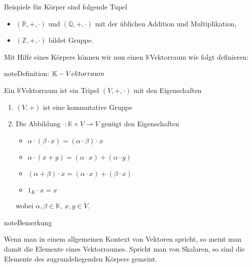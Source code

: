 \documentclass[letterpaper,10pt,english]{jupyterBook}
\begin{document}
Beispiele für Körper sind folgende Tupel
\begin{itemize}
\item {} 
\((\mathbb{R}, +, \cdot)\) und \((\mathbb{Q}, +, \cdot)\)  mit der üblichen Addition und Multiplikation,

\item {} 
\((\mathbb{Z}, +, \cdot)\) bildet  Gruppe.

\end{itemize}

Mit Hilfe eines Körpers können wir nun einen \(\mathbb{K}\)\sphinxhyphen{}Vektorraum wie folgt definieren:

\begin{sphinxadmonition}{note}{Definition: \protect\(\mathbb{K}-Vektorraum\protect\)}

Ein \(\mathbb{K}\)\sphinxhyphen{}Vektorraum ist ein Tripel \((V, +, \cdot)\) mit den Eigenschaften
\begin{enumerate}
%
\item {} 
\((V,+)\) ist eine kommutative Gruppe

\item {} 
Die Abbildung \(\cdot : \mathbb{K} \times V \to V\) genügt den Eigenschaften
\begin{itemize}
\item {} 
\(\alpha\cdot (\beta\cdot x) = (\alpha\cdot \beta)\cdot x\)

\item {} 
\(\alpha\cdot (x+y) = (\alpha\cdot x) + (\alpha\cdot y)\)

\item {} 
\((\alpha+\beta)\cdot x = (\alpha\cdot x) + (\beta\cdot x)\)

\item {} 
\(1_K \cdot x = x\)

\end{itemize}

wobei \(\alpha, \beta\in\mathbb{K},\ x, y\in V\).

\end{enumerate}
\end{sphinxadmonition}

\begin{sphinxadmonition}{note}{Bemerkung}

Wenn man in einem allgemeinen Kontext von Vektoren spricht, so meint man damit die Elemente eines Vektorraumes. Spricht man von Skalaren, so sind die Elemente des zugrundeliegenden Körpers gemeint.
\end{sphinxadmonition}
\end{document}
